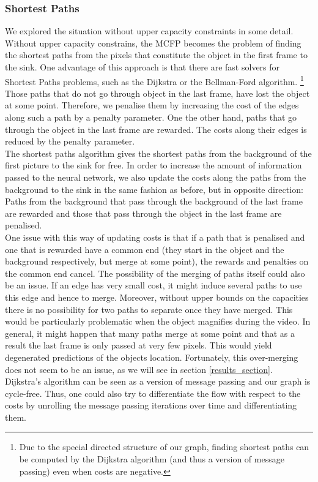 \documentclass{article}
\begin{document}
{\subsubsection{Shortest Paths}\label{shortestPaths}
We explored the situation without upper capacity constraints in some detail. Without upper capacity constrains, the MCFP becomes the problem of finding the shortest paths from the pixels that constitute the object in the first frame to the sink. One advantage of this approach is that there are fast solvers for Shortest Paths problems, such as the Dijkstra  or the Bellman-Ford algorithm.
\footnote{Due to the special directed structure of our graph, finding shortest paths can be computed by the Dijkstra algorithm (and thus a version of message passing) even when costs are negative.}
Those paths that do not go through object in the last frame, have lost the object at some point. Therefore, we penalise them by increasing the cost of the edges along such a path by a penalty parameter. One the other hand, paths that go through the object in the last frame are rewarded. The costs along their edges is reduced by the penalty parameter.\\
The shortest paths algorithm gives the shortest paths from the background of the first picture to the sink for free. In order to increase the amount of information passed to the neural network, we also update the costs along the paths from the background to the sink in the same fashion as before, but in opposite direction: Paths from the background that pass through the background of the last frame are rewarded and those that pass through the object in the last frame are penalised.\\
One issue with this way of updating costs is that if a path that is penalised and one that is rewarded have a common end (they start in the object and the background respectively, but merge at some point), the rewards and penalties on the common end cancel. The possibility of the merging of paths itself could also be an issue. If an edge has very small cost, it might induce several paths to use this edge and hence to merge. Moreover, without upper bounds on the capacities there is no possibility for two paths to separate once they have merged. This would be particularly problematic when the object magnifies during the video. In general, it might happen that many paths merge at some point and that as a result the last frame is only passed at very few pixels. This would yield degenerated predictions of the objects location. Fortunately, this over-merging does not seem to be an issue, as we will see in section \ref{results_section}.\\
Dijkstra's algorithm can be seen as a version of message passing and our graph is cycle-free. Thus, one could also try to differentiate the flow with respect to the costs by unrolling the message passing iterations over time and differentiating them.

}
\end{document}
